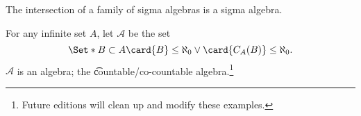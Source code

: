 \begin{prop}
  The intersection of a family of sigma algebras is
  a sigma algebra.
  \label{sigma_algebra:sigmaintersection}
\end{prop}

\begin{expl}
  For any infinite set $A$,
  let $\mathcal{A}$ be the set
  $$
  \Set*{
    B \subset A
  }{
    \card{B} \leq \aleph_0 \lor
    \card{C_{A}(B)} \leq \aleph_0
  }.
  $$
  $\mathcal{A}$ is an algebra;
  the
  \t{countable/co-countable algebra}.\footnote{Future editions will clean up and modify these examples.}
\end{expl}
